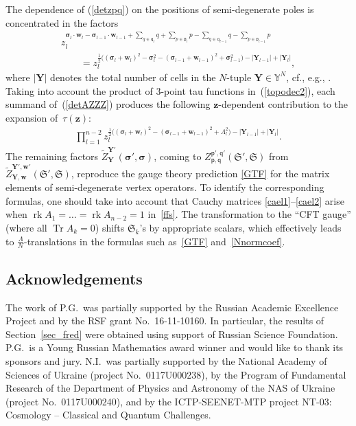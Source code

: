 \documentclass[pdftex]{sigma}
\newcommand{\bs}{\boldsymbol}
\numberwithin{equation}{section}
\begin{document}
The dependence of (\ref{detzpq}) on the positions of semi-degenerate poles is concentrated in the factors
\begin{gather*}
z_l^{\boldsymbol{\sigma}_l\cdot\boldsymbol{w}_l-\boldsymbol{\sigma}_{l-1}\cdot\boldsymbol{w}_{l-1}+\sum\limits_{q\in\boldsymbol{\mathsf q}_{l}} q+\sum\limits_{p\in\boldsymbol{\mathsf p}_{l}} p-\sum\limits_{q\in\boldsymbol{\mathsf q}_{l-1}}q-\sum\limits_{p\in\boldsymbol{\mathsf p}_{l-1}}p }\\
\qquad{}=
z_l^{\frac12\big(({\bs \sigma}_{l}+{\bs w}_{l})^2-{\bs \sigma}_{l}^2-({\bs \sigma}_{l-1}+{\bs w}_{l-1})^2+{\bs \sigma}_{l-1}^2\big)-|\bs Y_{l-1}|+|\bs Y_{l}|},
\end{gather*}
where $|\bs Y|$ denotes the total number of cells in the $N$-tuple $\mathbf Y \in \mathbb Y^N$, cf., e.g., \cite[Fig.~13]{GL16}. Taking into account the product of 3-point tau functions in~(\ref{topodec2}), each summand of~(\ref{detAZZZ}) produces the following $\bs z$-dependent contribution to the expansion of~$\tau(\bs z)$:
\begin{gather*}%
\prod_{l=1}^{n-2}
z_l^{\frac12\big(({\bs \sigma}_{l}+{\bs w}_{l})^2-({\bs \sigma}_{l-1}+{\bs w}_{l-1})^2+\Lambda_{l}^2\big)-|\bs Y_{l-1}|+|\bs Y_{l}| }.
\end{gather*}
The remaining factors ${\tilde{Z}}^{\bs Y'}_{\bs Y} (\bs \sigma', \bs\sigma)$, coming to $Z^{\boldsymbol{\mathsf p}',\boldsymbol{\mathsf q}'}_{\boldsymbol{\mathsf p},\boldsymbol{\mathsf q}}(\mathfrak S', \mathfrak S)$ from ${\tilde{Z}}^{\bs Y', \bs w'}_{\bs Y, \bs w} (\mathfrak S', \mathfrak S)$, reproduce the gauge theory prediction \eqref{GTF} for the matrix elements of semi-degenerate vertex operators. To identify the corresponding formulas, one should take into account that Cauchy matrices \eqref{cael1}--\eqref{cael2} arise when $\operatorname{rk}A_1=\dots=\operatorname{rk}A_{n-2} =1$ in~\eqref{ffs}. The transformation to the ``CFT gauge'' (where all $\operatorname{Tr}A_k=0$) shifts $\mathfrak S_k$'s by appropriate scalars, which effectively leads to $\frac \Lambda N$-translations in the formulas such as~\eqref{GTF} and~\eqref{Nnormcoef}.

\subsection*{Acknowledgements}
The work of P.G.\ was partially supported by the Russian Academic Excellence Project  and by the RSF grant No.~16-11-10160. In particular, the results of Section~\ref{sec_fred} were obtained using support of Russian Science Foundation. P.G.\ is a Young Russian Mathematics award winner and would like to thank its sponsors and jury. N.I.\ was partially supported by the National Academy of Sciences of Ukraine (project No.~0117U000238), by the Program of Fundamental Research of the Department of Physics and Astronomy of the NAS of Ukraine (project No.~0117U000240), and by the ICTP-SEENET-MTP project NT-03: Cosmology -- Classical and Quantum Challenges.
\end{document}
